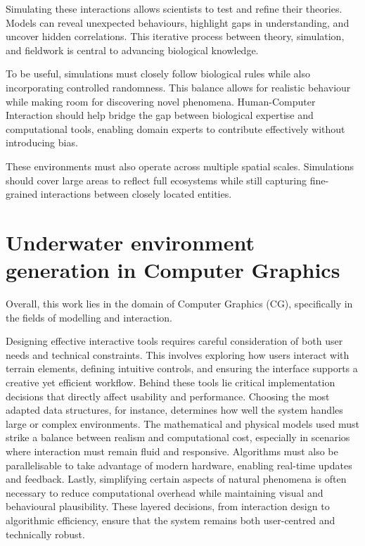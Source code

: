 Simulating these interactions allows scientists to test and refine their theories. Models can reveal unexpected behaviours, highlight gaps in understanding, and uncover hidden correlations. This iterative process between theory, simulation, and fieldwork is central to advancing biological knowledge.

To be useful, simulations must closely follow biological rules while also incorporating controlled randomness. This balance allows for realistic behaviour while making room for discovering novel phenomena. Human-Computer Interaction should help bridge the gap between biological expertise and computational tools, enabling domain experts to contribute effectively without introducing bias.


These environments must also operate across multiple spatial scales. Simulations should cover large areas to reflect full ecosystems while still capturing fine-grained interactions between closely located entities.

\section{Underwater environment generation in Computer Graphics}

Overall, this work lies in the domain of Computer Graphics (CG), specifically in the fields of modelling and interaction.

Designing effective interactive tools requires careful consideration of both user needs and technical constraints. This involves exploring how users interact with terrain elements, defining intuitive controls, and ensuring the interface supports a creative yet efficient workflow. Behind these tools lie critical implementation decisions that directly affect usability and performance. Choosing the most adapted data structures, for instance, determines how well the system handles large or complex environments. The mathematical and physical models used must strike a balance between realism and computational cost, especially in scenarios where interaction must remain fluid and responsive. Algorithms must also be parallelisable to take advantage of modern hardware, enabling real-time updates and feedback. Lastly, simplifying certain aspects of natural phenomena is often necessary to reduce computational overhead while maintaining visual and behavioural plausibility. These layered decisions, from interaction design to algorithmic efficiency, ensure that the system remains both user-centred and technically robust.




